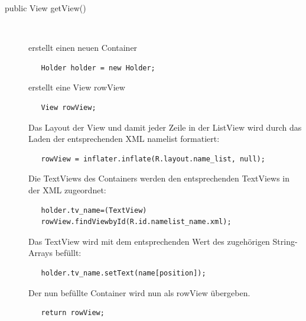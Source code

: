 \begin{description}
\item [public View getView()]~\par
erstellt einen neuen Container 
\begin{lstlisting}
   Holder holder = new Holder;
\end{lstlisting}
erstellt eine View rowView
\begin{lstlisting}
   View rowView;
\end{lstlisting}
Das Layout der View und damit jeder Zeile in der ListView wird durch das Laden der entsprechenden XML namelist formatiert:
\begin{lstlisting}
   rowView = inflater.inflate(R.layout.name_list, null);
\end{lstlisting}
Die TextViews des Containers werden den entsprechenden TextViews in der XML zugeordnet:
\begin{lstlisting}
   holder.tv_name=(TextView)
   rowView.findViewbyId(R.id.namelist_name.xml);
\end{lstlisting}
Das TextView wird mit dem entsprechenden Wert des zugehörigen String-Arrays befüllt:
\begin{lstlisting}
   holder.tv_name.setText(name[position]);
\end{lstlisting}
Der nun befüllte Container wird nun als rowView übergeben.
\begin{lstlisting}
   return rowView;
\end{lstlisting}
\newpage


\end{description}
